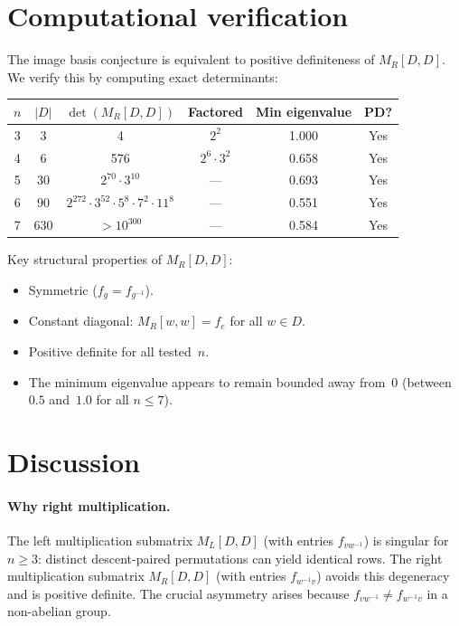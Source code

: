 \documentclass[11pt]{article}
\theoremstyle{definition}
\theoremstyle{remark}
\begin{document}
\section{Computational verification}

The image basis conjecture is equivalent to positive definiteness of
$M_R[D,D]$.
We verify this by computing exact determinants:

\begin{center}
\begin{tabular}{cccccc}
\hline
$n$ & $|D|$ & $\det(M_R[D,D])$ & Factored & Min eigenvalue & PD? \\
\hline
3 & 3 & 4 & $2^2$ & 1.000 & Yes \\
4 & 6 & 576 & $2^6 \cdot 3^2$ & 0.658 & Yes \\
5 & 30 & $2^{70} \cdot 3^{10}$ & --- & 0.693 & Yes \\
6 & 90 & $2^{272} \cdot 3^{52} \cdot 5^8 \cdot 7^2 \cdot 11^8$ & --- & 0.551 & Yes \\
7 & 630 & $> 10^{300}$ & --- & 0.584 & Yes \\
\hline
\end{tabular}
\end{center}

\noindent
Key structural properties of $M_R[D,D]$:
\begin{itemize}
\item Symmetric ($f_g = f_{g^{-1}}$).
\item Constant diagonal: $M_R[w,w] = f_e$ for all $w \in D$.
\item Positive definite for all tested~$n$.
\item The minimum eigenvalue appears to remain bounded away from~$0$
(between $0.5$ and~$1.0$ for all $n \leq 7$).
\end{itemize}

\section{Discussion}

\paragraph{Why right multiplication.}
The left multiplication submatrix $M_L[D,D]$ (with entries $f_{vw^{-1}}$)
is singular for $n \geq 3$: distinct descent-paired permutations can
yield identical rows.
The right multiplication submatrix $M_R[D,D]$ (with entries $f_{w^{-1}v}$)
avoids this degeneracy and is positive definite.
The crucial asymmetry arises because $f_{vw^{-1}} \neq f_{w^{-1}v}$
in a non-abelian group.
\end{document}
